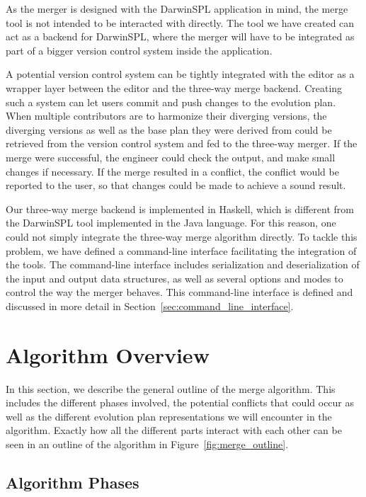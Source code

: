 \documentclass[a4paper,english]{ifimaster}
\begin{document}
As the merger is designed with the DarwinSPL application in mind, the merge tool is not intended to be interacted with directly. The tool we have created can act as a backend for DarwinSPL, where the merger will have to be integrated as part of a bigger version control system inside the application.

A potential version control system can be tightly integrated with the editor as a wrapper layer between the editor and the three-way merge backend. Creating such a system can let users commit and push changes to the evolution plan. When multiple contributors are to harmonize their diverging versions, the diverging versions as well as the base plan they were derived from could be retrieved from the version control system and fed to the three-way merger. If the merge were successful, the engineer could check the output, and make small changes if necessary. If the merge resulted in a conflict, the conflict would be reported to the user, so that changes could be made to achieve a sound result.

Our three-way merge backend is implemented in Haskell, which is different from the DarwinSPL tool implemented in the Java language. For this reason, one could not simply integrate the three-way merge algorithm directly. To tackle this problem, we have defined a command-line interface facilitating the integration of the tools. The command-line interface includes serialization and deserialization of the input and output data structures, as well as several options and modes to control the way the merger behaves. This command-line interface is defined and discussed in more detail in Section~\vref{sec:command_line_interface}.

\section{Algorithm Overview}%
\label{sec:algorithm_overview}

In this section, we describe the general outline of the merge algorithm. This includes the different phases involved, the potential conflicts that could occur as well as the different evolution plan representations we will encounter in the algorithm. Exactly how all the different parts interact with each other can be seen in an outline of the algorithm in Figure~\vref{fig:merge_outline}.

\subsection{Algorithm Phases}%
\label{sub:algorithm_phases}
\end{document}
